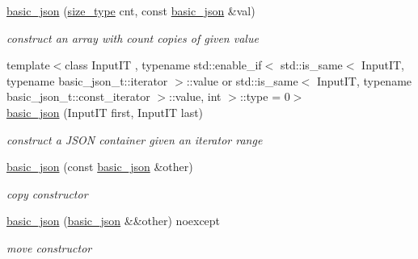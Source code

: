 \begin{DoxyCompactItemize}
\mbox{\hyperlink{classnlohmann_1_1basic__json_ab6816ae5100409254ed0a8bc21c387bb}{basic\+\_\+json}} (\mbox{\hyperlink{classnlohmann_1_1basic__json_a39f2cd0b58106097e0e67bf185cc519b}{size\+\_\+type}} cnt, const \mbox{\hyperlink{classnlohmann_1_1basic__json}{basic\+\_\+json}} \&val)
\begin{DoxyCompactList}\small\item\em construct an array with count copies of given value \end{DoxyCompactList}\item 
{\footnotesize template$<$class Input\+IT , typename std\+::enable\+\_\+if$<$ std\+::is\+\_\+same$<$ Input\+I\+T, typename basic\+\_\+json\+\_\+t\+::iterator $>$\+::value or std\+::is\+\_\+same$<$ Input\+I\+T, typename basic\+\_\+json\+\_\+t\+::const\+\_\+iterator $>$\+::value, int $>$\+::type  = 0$>$ }\\\mbox{\hyperlink{classnlohmann_1_1basic__json_abe197e9f3184487805cfb5bba6fd5938}{basic\+\_\+json}} (Input\+IT first, Input\+IT last)
\begin{DoxyCompactList}\small\item\em construct a J\+S\+ON container given an iterator range \end{DoxyCompactList}\item 
\mbox{\hyperlink{classnlohmann_1_1basic__json_af5de621bcf646c332343f9c1e011126c}{basic\+\_\+json}} (const \mbox{\hyperlink{classnlohmann_1_1basic__json}{basic\+\_\+json}} \&other)
\begin{DoxyCompactList}\small\item\em copy constructor \end{DoxyCompactList}\item 
\mbox{\hyperlink{classnlohmann_1_1basic__json_a9a06d1efd50a00f4889f831f851ce124}{basic\+\_\+json}} (\mbox{\hyperlink{classnlohmann_1_1basic__json}{basic\+\_\+json}} \&\&other) noexcept
\begin{DoxyCompactList}\small\item\em move constructor \end{DoxyCompactList}\item 

\end{DoxyCompactItemize}
